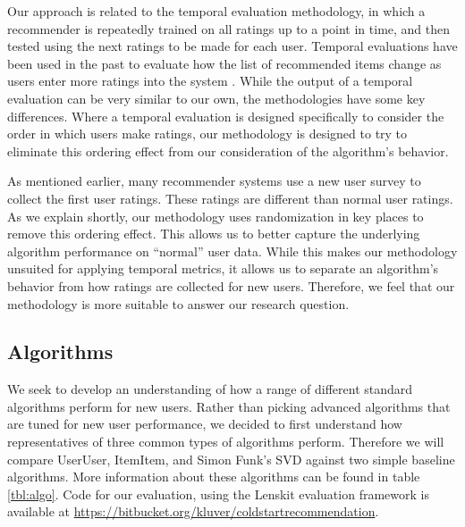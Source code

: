 \documentclass[letterpaper]{sig-alternate}
\begin{document}
  Our approach is related to the temporal evaluation methodology, in which a recommender is repeatedly trained on all ratings up to a point in time, and then tested using the next ratings to be made for each user.
  Temporal evaluations have been used in the past to evaluate how the list of recommended items change as users enter more ratings into the system \cite{LathiaTemporal}.
  While the output of a temporal evaluation can be very similar to our own, the methodologies have some key differences.
  Where a temporal evaluation is designed specifically to consider the order in which users make ratings, our methodology is designed to try to eliminate this ordering effect from our consideration of the algorithm's behavior.

  As mentioned earlier, many recommender systems use a new user survey to collect the first user ratings.
  These ratings are different than normal user ratings.
  As we explain shortly, our methodology uses randomization in key places to remove this ordering effect.
  This allows us to better capture the underlying algorithm performance on ``normal'' user data.
  While this makes our methodology unsuited for applying temporal metrics, it allows us to separate an algorithm's behavior from how ratings are collected for new users.
  Therefore, we feel that our methodology is more suitable to answer our research question.

  \subsection*{Algorithms}

  We seek to develop an understanding of how a range of different standard algorithms perform for new users.
  Rather than picking advanced algorithms that are tuned for new user performance, we decided to first understand how representatives of three common types of algorithms perform.
  Therefore we will compare UserUser\cite{resnick1994grouplens}, ItemItem\cite{sarwar2001item}, and Simon Funk's SVD\cite{funk_netflix_2006} against two simple baseline algorithms.
  More information about these algorithms can be found in table \ref{tbl:algo}.
  Code for our evaluation, using the Lenskit evaluation framework \cite{lenskit} is available at \url{https://bitbucket.org/kluver/coldstartrecommendation}.
  
\end{document}
